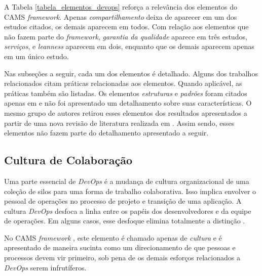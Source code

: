 A Tabela \ref{tabela_elementos_devops} reforça a relevância dos elementos do
\acrshort{CAMS} \textit{framework}. Apenas \emph{compartilhamento} deixa de
aparecer em um dos estudos citados, os demais aparecem em todos. Com relação
aos elementos que não fazem parte do \textit{framework}, \emph{garantia
da qualidade} aparece em três estudos, \emph{serviços}, e \emph{leanness}
aparecem em dois, enquanto que os demais aparecem apenas em um único estudo.

Nas subseções a seguir, cada um dos elementos é detalhado. Alguns dos trabalhos
relacionados citam práticas relacionadas aos elementos. Quando aplicável, as
práticas também são listadas. Os elementos \emph{estruturas} e \emph{padrões}
foram citados apenas em \cite{cooperation_dev_ops_esem_2014} e não foi
apresentado um detalhamento sobre suas características. O mesmo grupo de
autores retirou esses elementos dos resultados apresentados a partir de uma
nova revisão de literatura realizada em \cite{qualitative_devops_journalsw_17}.
Assim sendo, esses elementos não fazem parte do detalhamento apresentado a
seguir.

\subsection{Cultura de Colaboração}

Uma parte essencial de {\it DevOps} é a mudança de cultura organizacional de
uma coleção de silos para uma forma de trabalho colaborativa. Isso implica
envolver o pessoal de operações no processo de projeto e transição de uma
aplicação. A cultura {\it DevOps} desfoca a linha entre os papéis dos
desenvolvedores e da equipe de operações. Em alguns casos, esse desfoque
elimina totalmente a distinção \cite{challenges_in_adopting_devops}.

No \acrshort{CAMS} \textit{framework} \cite{what_devops_means_2010}, este
elemento é chamado apenas de \emph{cultura} e é apresentado de maneira sucinta
como um direcionamento de que pessoas e processos devem vir primeiro, sob pena
de os demais esforços relacionados a \textit{DevOps} serem infrutíferos.

